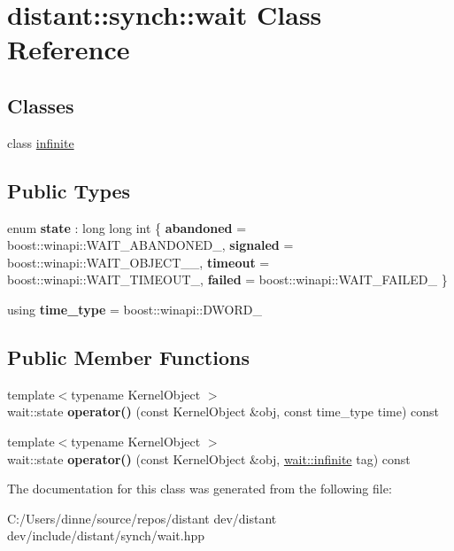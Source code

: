 \hypertarget{classdistant_1_1synch_1_1wait}{}\section{distant\+:\+:synch\+:\+:wait Class Reference}
\label{classdistant_1_1synch_1_1wait}
\subsection*{Classes}
\begin{DoxyCompactItemize}
\item 
class \mbox{\hyperlink{classdistant_1_1synch_1_1wait_1_1infinite}{infinite}}
\end{DoxyCompactItemize}
\subsection*{Public Types}
\begin{DoxyCompactItemize}
\item 
\mbox{\label{classdistant_1_1synch_1_1wait_a32fac876e06a892057a902aeda135ea2}} 
enum {\bfseries state} \+: long long int \{ {\bfseries abandoned} = boost\+:\+:winapi\+:\+:W\+A\+I\+T\+\_\+\+A\+B\+A\+N\+D\+O\+N\+E\+D\+\_\+, 
{\bfseries signaled} = boost\+:\+:winapi\+:\+:W\+A\+I\+T\+\_\+\+O\+B\+J\+E\+C\+T\+\_\+\_\+, 
{\bfseries timeout} = boost\+:\+:winapi\+:\+:W\+A\+I\+T\+\_\+\+T\+I\+M\+E\+O\+U\+T\+\_\+, 
{\bfseries failed} = boost\+:\+:winapi\+:\+:W\+A\+I\+T\+\_\+\+F\+A\+I\+L\+E\+D\+\_\+
 \}
\item 
\mbox{\label{classdistant_1_1synch_1_1wait_ad3b91d21b04169ae77e5bc31ce1bc506}} 
using {\bfseries time\+\_\+type} = boost\+::winapi\+::\+D\+W\+O\+R\+D\+\_\+
\end{DoxyCompactItemize}
\subsection*{Public Member Functions}
\begin{DoxyCompactItemize}
\item 
\mbox{\label{classdistant_1_1synch_1_1wait_a090809d622ba2545bb2e61ea621efd5c}} 
{\footnotesize template$<$typename Kernel\+Object $>$ }\\wait\+::state {\bfseries operator()} (const Kernel\+Object \&obj, const time\+\_\+type time) const
\item 
\mbox{\label{classdistant_1_1synch_1_1wait_a6e1e5bce76b3e4a5392a9392e0e8d369}} 
{\footnotesize template$<$typename Kernel\+Object $>$ }\\wait\+::state {\bfseries operator()} (const Kernel\+Object \&obj, \mbox{\hyperlink{classdistant_1_1synch_1_1wait_1_1infinite}{wait\+::infinite}} tag) const
\end{DoxyCompactItemize}


The documentation for this class was generated from the following file\+:\begin{DoxyCompactItemize}
\item 
C\+:/\+Users/dinne/source/repos/distant dev/distant dev/include/distant/synch/wait.\+hpp\end{DoxyCompactItemize}
